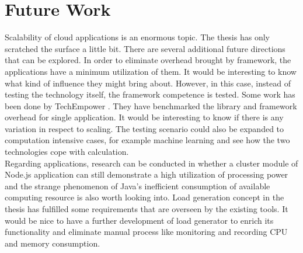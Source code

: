 \chapter{Future Work}
Scalability of cloud applications is an enormous topic. The thesis has only scratched the surface a little bit. There are several additional future directions that can be explored. In order to eliminate overhead brought by framework, the applications have a minimum utilization of them. It would be interesting to know what kind of influence they might bring about. However, in this case, instead of testing the technology itself, the framework competence is tested. Some work has been done by TechEmpower \citep{Benchmark}. They have benchmarked the library and framework overhead for single application. It would be interesting to know if there is any variation in respect to scaling. The testing scenario could also be expanded to computation intensive cases, for example machine learning and see how the two technologies cope with calculation. \\
Regarding applications, research can be conducted in whether a cluster module of Node.js application can still demonstrate a high utilization of processing power and the strange phenomenon of Java's inefficient consumption of available computing resource is also worth looking into. Load generation concept in the thesis has fulfilled some requirements that are overseen by the existing tools. It would be nice to have a further development of load generator to enrich its functionality and eliminate manual process like monitoring and recording CPU and memory consumption. \\